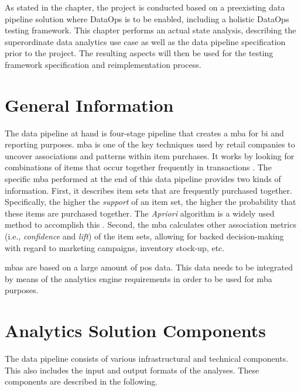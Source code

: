 
As stated in the  chapter, the project is conducted based on a preexisting data pipeline solution where DataOps is to be enabled, including a holistic DataOps testing framework. This chapter performs an actual state analysis, describing the superordinate data analytics use case as well as the data pipeline specification prior to the project. The resulting aspects will then be used for the testing framework specification and reimplementation process.

\section{General Information}
The data pipeline at hand is four-stage pipeline that creates a \acf{mba} for \ac{bi} and reporting purposes. \ac{mba} is one of the key techniques used by retail companies to uncover associations and patterns within item purchases. It works by looking for combinations of items that occur together frequently in transactions \cite[1]{Chen2005}. The specific \ac{mba} performed at the end of this data pipeline provides two kinds of information. First, it describes item sets that are frequently purchased together. Specifically, the higher the \textit{support} of an item set, the higher the probability that these items are purchased together. The \textit{Apriori} algorithm is a widely used method to accomplish this \cite[12\psq]{Wu2008}. Second, the \ac{mba} calculates other association metrics (i.e., \textit{confidence} and \textit{lift}) of the item sets, allowing for backed decision-making with regard to marketing campaigns, inventory stock-up, etc.

\acp{mba} are based on a large amount of \acf{pos} data. This data needs to be integrated by means of the analytics engine requirements in order to be used for \ac{mba} purposes.

\section{Analytics Solution Components}
The data pipeline consists of various infrastructural and technical components. This also includes the input and output formats of the analyses. These components are described in the following.

